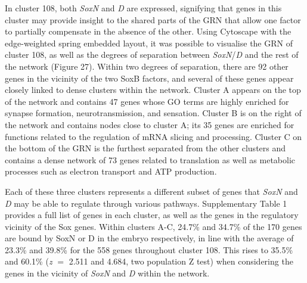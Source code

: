 \documentclass[withindex,glossary]{cam-thesis}
\begin{document}
In cluster 108, both \emph{SoxN} and \emph{D} are expressed, signifying
that genes in this cluster may provide insight to the shared parts of
the GRN that allow one factor to partially compensate in the absence of
the other. Using Cytoscape with the edge-weighted spring embedded
layout, it was possible to visualise the GRN of cluster 108, as well as
the degrees of separation between \emph{SoxN}/\emph{D} and the rest of
the network (Figure 27). Within two degrees of separation, there are 92
other genes in the vicinity of the two SoxB factors, and several of
these genes appear closely linked to dense clusters within the network.
Cluster A appears on the top of the network and contains 47 genes whose
GO terms are highly enriched for synapse formation, neurotransmission,
and sensation. Cluster B is on the right of the network and contains
nodes close to cluster A; its 35 genes are enriched for functions
related to the regulation of mRNA slicing and processing. Cluster C on
the bottom of the GRN is the furthest separated from the other clusters
and contains a dense network of 73 genes related to translation as well
as metabolic processes such as electron transport and ATP production.



Each of these three clusters represents a different subset of genes that
\emph{SoxN} and \emph{D} may be able to regulate through various
pathways. Supplementary Table 1 provides a full list of genes in each
cluster, as well as the genes in the regulatory vicinity of the Sox
genes. Within clusters A-C, 24.7\% and 34.7\% of the 170 genes are bound
by SoxN or D in the embryo respectively, in line with the average of
23.3\% and 39.8\% for the 558 genes throughout cluster 108. This rises
to 35.5\% and 60.1\% (\emph{z} $=$ 2.511 and 4.684, two population Z test)
when considering the genes in the vicinity of \emph{SoxN} and \emph{D}
within the network.
\end{document}
